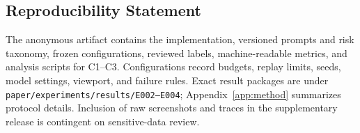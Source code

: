 \subsection*{Reproducibility Statement}

The anonymous artifact contains the implementation, versioned prompts and risk
taxonomy, frozen configurations, reviewed labels, machine-readable metrics, and
analysis scripts for C1--C3. Configurations record budgets, replay limits,
seeds, model settings, viewport, and failure rules. Exact result packages are
under \texttt{paper/experiments/results/E002--E004};
Appendix~\ref{app:method} summarizes protocol details. Inclusion of raw
screenshots and traces in the supplementary release is contingent on
sensitive-data review.
